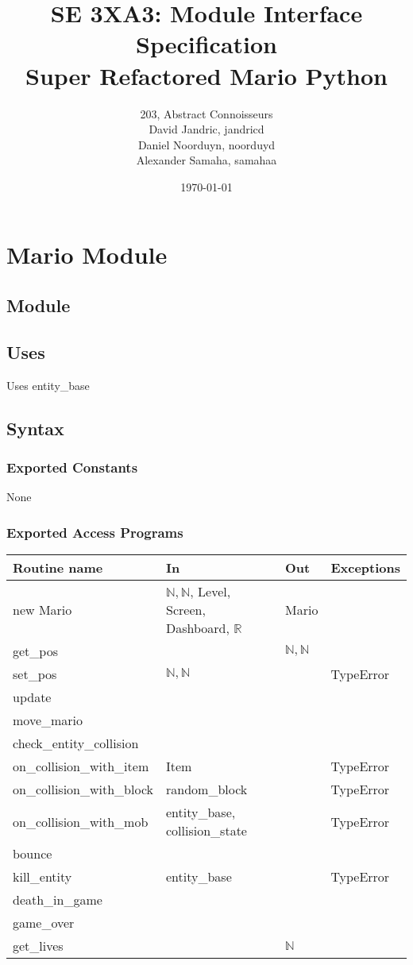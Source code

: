 \documentclass[12pt]{article}
\title{SE 3XA3: Module Interface Specification\\Super Refactored Mario Python}
\author{203, Abstract Connoisseurs 
		\\ David Jandric, jandricd
		\\ Daniel Noorduyn, noorduyd
		\\ Alexander Samaha, samahaa
}
\date{\today}
\begin{document}
\maketitle

\newpage
\section*{Mario Module}
\subsection*{Module}
\subsection*{Uses}
Uses entity\_base
\subsection*{Syntax}
\subsubsection*{Exported Constants}
None
\subsubsection*{Exported Access Programs}
\begin{tabular}{| l | l | l | p{5cm} |}
\hline
\textbf{Routine name} & \textbf{In} & \textbf{Out} & \textbf{Exceptions}\\
\hline
new Mario & $\mathbb{N}, \mathbb{N}$, Level, Screen, Dashboard, $\mathbb{R}$ & Mario & \\
\hline
get\_pos & & $\mathbb{N}, \mathbb{N}$ &\\
\hline
set\_pos & $\mathbb{N}, \mathbb{N}$ & & TypeError\\
\hline
update & & &\\
\hline
move\_mario & & & \\
\hline
check\_entity\_collision & & &\\
\hline
on\_collision\_with\_item & Item & & TypeError\\
\hline
on\_collision\_with\_block & random\_block & & TypeError\\
\hline
on\_collision\_with\_mob & entity\_base, collision\_state & & TypeError\\
\hline
bounce & & &\\
\hline
kill\_entity & entity\_base & & TypeError\\
\hline
death\_in\_game & & &\\
\hline
game\_over & & &\\
\hline
get\_lives & & $\mathbb{N}$ &\\
\hline
\end{tabular}
\end{document}
